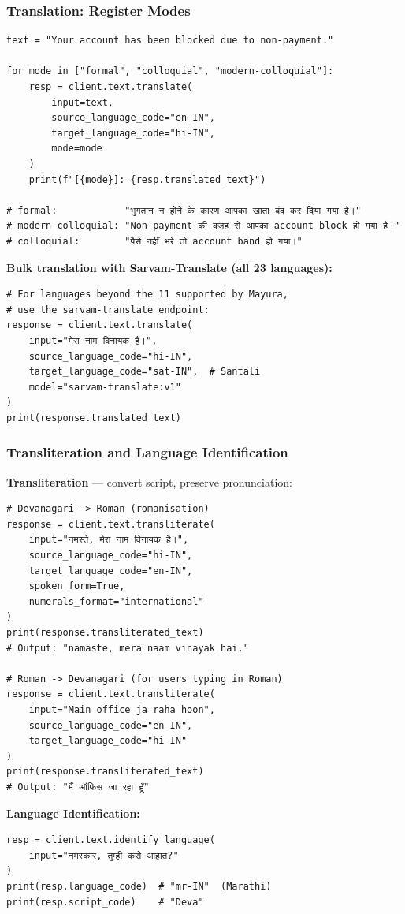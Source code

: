 \begin{frame}[fragile]\frametitle{Translation: Register Modes}
\begin{lstlisting}
text = "Your account has been blocked due to non-payment."

for mode in ["formal", "colloquial", "modern-colloquial"]:
    resp = client.text.translate(
        input=text,
        source_language_code="en-IN",
        target_language_code="hi-IN",
        mode=mode
    )
    print(f"[{mode}]: {resp.translated_text}")

# formal:            "भुगतान न होने के कारण आपका खाता बंद कर दिया गया है।"
# modern-colloquial: "Non-payment की वजह से आपका account block हो गया है।"
# colloquial:        "पैसे नहीं भरे तो account band हो गया।"
\end{lstlisting}

\textbf{Bulk translation with Sarvam-Translate (all 23 languages):}
\begin{lstlisting}
# For languages beyond the 11 supported by Mayura,
# use the sarvam-translate endpoint:
response = client.text.translate(
    input="मेरा नाम विनायक है।",
    source_language_code="hi-IN",
    target_language_code="sat-IN",  # Santali
    model="sarvam-translate:v1"
)
print(response.translated_text)
\end{lstlisting}
\end{frame}

\begin{frame}[fragile]\frametitle{Transliteration and Language Identification}
\textbf{Transliteration} --- convert script, preserve pronunciation:
\begin{lstlisting}
# Devanagari -> Roman (romanisation)
response = client.text.transliterate(
    input="नमस्ते, मेरा नाम विनायक है।",
    source_language_code="hi-IN",
    target_language_code="en-IN",
    spoken_form=True,
    numerals_format="international"
)
print(response.transliterated_text)
# Output: "namaste, mera naam vinayak hai."

# Roman -> Devanagari (for users typing in Roman)
response = client.text.transliterate(
    input="Main office ja raha hoon",
    source_language_code="en-IN",
    target_language_code="hi-IN"
)
print(response.transliterated_text)
# Output: "मैं ऑफिस जा रहा हूँ"
\end{lstlisting}

\textbf{Language Identification:}
\begin{lstlisting}
resp = client.text.identify_language(
    input="नमस्कार, तुम्ही कसे आहात?"
)
print(resp.language_code)  # "mr-IN"  (Marathi)
print(resp.script_code)    # "Deva"
\end{lstlisting}
\end{frame}


